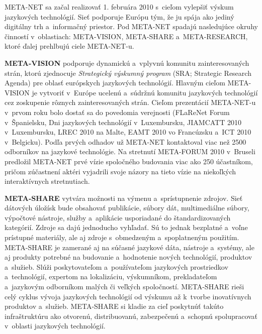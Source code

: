 \noindent META-NET sa začal realizovať 1. februára 2010 s~cieľom vylepšiť výskum jazykových technológií. Sieť podporuje Európu tým, že ju spája ako jediný digitálny trh a~informačný priestor. Pod META-NET spadajú nasledujúce okruhy činností v~oblastiach: META-VISION, META-SHARE a~META-RESEARCH, ktoré ďalej prehlbujú ciele META-NET-u.


{\bf META-VISION} podporuje dynamickú a~vplyvnú komunitu zainteresovaných strán, ktorú zjednocuje \emph{Strategický výskumný program} (SRA; Strategic Research Agenda) pre oblasť európskych jazykových technológií. Hlavným cieľom META-VISION je vytvoriť v~Európe ucelenú a~súdržnú komunitu jazykových technológií cez zoskupenie rôznych zainteresovaných strán. Cieľom prezentácií META-NET-u v~prvom roku bolo dostať sa do povedomia verejnosti (FLaReNet Forum v~Španielsku, Dni jazykových technológií v~Luxembursku, JIAMCATT 2010 v~Luxembursku, LREC 2010 na Malte, EAMT 2010 vo Francúzsku a~ICT 2010 v~Belgicku). Podľa prvých odhadov už META-NET kontaktoval viac než 2500 odborníkov na jazykové technológie. Na stretnutí META-FORUM 2010 v~Bruseli predložil META-NET prvé vízie spoločného budovania viac ako 250 účastníkom, pričom zúčastnení aktéri vyjadrili svoje názory na tieto vízie na niekoľkých interaktívnych stretnutiach.

{\bf META-SHARE} vytvára možnosti na výmenu a~sprístupnenie zdrojov. Sieť dátových úložísk bude obsahovať publikácie, súbory dát, multimediálne súbory, výpočtové nástroje, služby a~aplikácie usporiadané do štandardizovaných kategórií. Zdroje sa dajú jednoducho vyhľadať. Sú to jednak bezplatné a~voľne prístupné materiály, ale aj zdroje s~obmedzeným a~spoplatneným použitím. META-SHARE je zamerané aj na súčasné jazykové dáta, nástroje a~systémy, ale aj produkty potrebné na budovanie a~hodnotenie nových technológií, produktov a~služieb. Slúži poskytovateľom a~používateľom jazykových prostriedkov a~technológií, expertom na lokalizáciu, výskumníkom, prekladateľom a~jazykovým odborníkom malých či veľkých spoločností. META-SHARE rieši celý cyklus vývoja jazykových technológií od výskumu až k~tvorbe inovatívnych produktov a~služieb. META-SHARE si kladie za cieľ poskytnúť takúto infraštruktúru ako otvorenú, distribuovanú, zabezpečenú a~schopnú spolupracovať v~oblasti jazykových technológií. 

